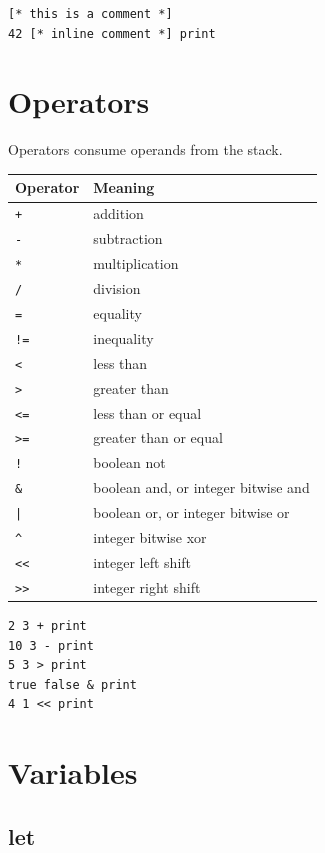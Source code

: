 \documentclass[11pt,a4paper]{article}
\newcommand{\code}[1]{\texttt{#1}}
\begin{document}
\begin{lstlisting}[language=Raden]
[* this is a comment *]
42 [* inline comment *] print
\end{lstlisting}

\section{Operators}

Operators consume operands from the stack.

\begin{longtable}{ll}
\toprule
Operator & Meaning \\
\midrule
\code{+} & addition \\
\code{-} & subtraction \\
\code{*} & multiplication \\
\code{/} & division \\
\code{=} & equality \\
\code{!=} & inequality \\
\code{<} & less than \\
\code{>} & greater than \\
\code{<=} & less than or equal \\
\code{>=} & greater than or equal \\
\code{!} & boolean not \\
\code{\&} & boolean and, or integer bitwise and \\
\code{|} & boolean or, or integer bitwise or \\
\code{\^{}} & integer bitwise xor \\
\code{<<} & integer left shift \\
\code{>>} & integer right shift \\
\bottomrule
\end{longtable}

\begin{lstlisting}[language=Raden]
2 3 + print
10 3 - print
5 3 > print
true false & print
4 1 << print
\end{lstlisting}

\section{Variables}

\subsection{let}
\end{document}
